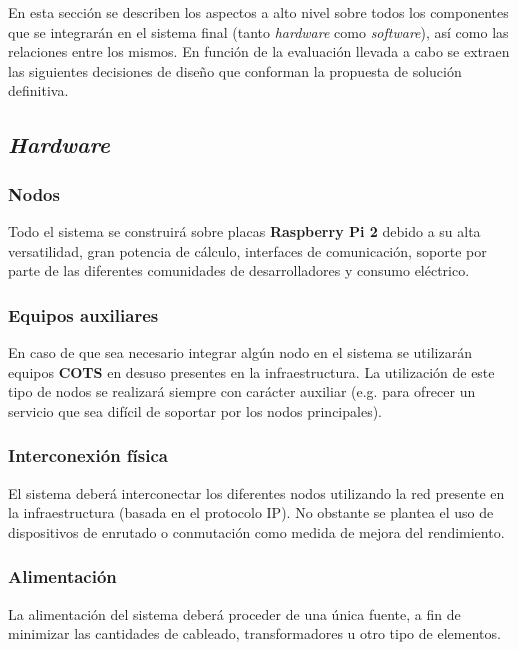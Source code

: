 En esta sección se describen los aspectos a alto nivel sobre todos los componentes que se integrarán en el sistema final (tanto \textit{hardware} como \textit{software}), así como las relaciones entre los mismos. En función de la evaluación llevada a cabo se extraen las siguientes decisiones de diseño que conforman la propuesta de solución definitiva.



\subsection{\textit{Hardware}}

\subsubsection{Nodos}

Todo el sistema se construirá sobre placas \textbf{Raspberry Pi 2} debido a su alta versatilidad, gran potencia de cálculo, interfaces de comunicación, soporte por parte de las diferentes comunidades de desarrolladores y consumo eléctrico.

\subsubsection{Equipos auxiliares}

En caso de que sea necesario integrar algún nodo en el sistema se utilizarán equipos \textbf{COTS} en desuso presentes en la infraestructura. La utilización de este tipo de nodos se realizará siempre con carácter auxiliar (e.g. para ofrecer un servicio que sea difícil de soportar por los nodos principales).

\subsubsection{Interconexión física}

El sistema deberá interconectar los diferentes nodos utilizando la red presente en la infraestructura (basada en el protocolo IP). No obstante se plantea el uso de dispositivos de enrutado o conmutación como medida de mejora del rendimiento.

\subsubsection{Alimentación}

La alimentación del sistema deberá proceder de una única fuente, a fin de minimizar las cantidades de  cableado, transformadores u otro tipo de elementos.

